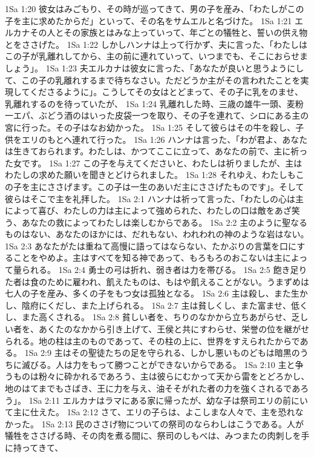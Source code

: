 1Sa 1:20  彼女はみごもり、その時が巡ってきて、男の子を産み、「わたしがこの子を主に求めたからだ」といって、その名をサムエルと名づけた。
1Sa 1:21  エルカナその人とその家族とはみな上っていって、年ごとの犠牲と、誓いの供え物とをささげた。
1Sa 1:22  しかしハンナは上って行かず、夫に言った、「わたしはこの子が乳離れしてから、主の前に連れていって、いつまでも、そこにおらせましょう」。
1Sa 1:23  夫エルカナは彼女に言った、「あなたが良いと思うようにして、この子の乳離れするまで待ちなさい。ただどうか主がその言われたことを実現してくださるように」。こうしてその女はとどまって、その子に乳をのませ、乳離れするのを待っていたが、
1Sa 1:24  乳離れした時、三歳の雄牛一頭、麦粉一エパ、ぶどう酒のはいった皮袋一つを取り、その子を連れて、シロにある主の宮に行った。その子はなお幼かった。
1Sa 1:25  そして彼らはその牛を殺し、子供をエリのもとへ連れて行った。
1Sa 1:26  ハンナは言った、「わが君よ、あなたは生きておられます。わたしは、かつてここに立って、あなたの前で、主に祈った女です。
1Sa 1:27  この子を与えてくださいと、わたしは祈りましたが、主はわたしの求めた願いを聞きとどけられました。
1Sa 1:28  それゆえ、わたしもこの子を主にささげます。この子は一生のあいだ主にささげたものです」。そして彼らはそこで主を礼拝した。
1Sa 2:1  ハンナは祈って言った、「わたしの心は主によって喜び、わたしの力は主によって強められた、わたしの口は敵をあざ笑う、あなたの救によってわたしは楽しむからである。
1Sa 2:2  主のように聖なるものはない、あなたのほかには、だれもない、われわれの神のような岩はない。
1Sa 2:3  あなたがたは重ねて高慢に語ってはならない、たかぶりの言葉を口にすることをやめよ。主はすべてを知る神であって、もろもろのおこないは主によって量られる。
1Sa 2:4  勇士の弓は折れ、弱き者は力を帯びる。
1Sa 2:5  飽き足りた者は食のために雇われ、飢えたものは、もはや飢えることがない。うまずめは七人の子を産み、多くの子をもつ女は孤独となる。
1Sa 2:6  主は殺し、また生かし、陰府にくだし、また上げられる。
1Sa 2:7  主は貧しくし、また富ませ、低くし、また高くされる。
1Sa 2:8  貧しい者を、ちりのなかから立ちあがらせ、乏しい者を、あくたのなかから引き上げて、王侯と共にすわらせ、栄誉の位を継がせられる。地の柱は主のものであって、その柱の上に、世界をすえられたからである。
1Sa 2:9  主はその聖徒たちの足を守られる、しかし悪いものどもは暗黒のうちに滅びる。人は力をもって勝つことができないからである。
1Sa 2:10  主と争うものは粉々に砕かれるであろう、主は彼らにむかって天から雷をとどろかし、地のはてまでもさばき、王に力を与え、油そそがれた者の力を強くされるであろう」。
1Sa 2:11  エルカナはラマにある家に帰ったが、幼な子は祭司エリの前にいて主に仕えた。
1Sa 2:12  さて、エリの子らは、よこしまな人々で、主を恐れなかった。
1Sa 2:13  民のささげ物についての祭司のならわしはこうである。人が犠牲をささげる時、その肉を煮る間に、祭司のしもべは、みつまたの肉刺しを手に持ってきて、
